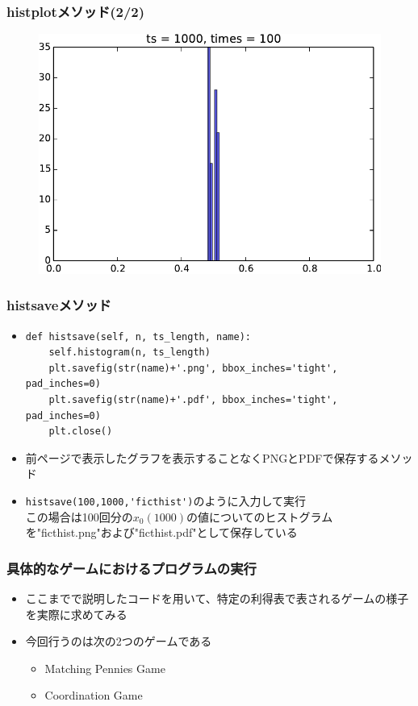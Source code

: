 \documentclass[dvipdfmx,fleqn,handout]{beamer}
\begin{document}
\begin{frame}
\frametitle{histplotメソッド(2/2)}
\begin{figure}
 \centering
 \includegraphics[width=\linewidth]{histogram2.pdf}
 \label{fig:matchingpennies_plot}
\end{figure}
\end{frame}

\begin{frame}[fragile]%
\frametitle{histsaveメソッド}
\begin{itemize}\setlength{\parskip}{0.5em}
\item
\scriptsize
\begin{verbatim}
def histsave(self, n, ts_length, name):
    self.histogram(n, ts_length)
    plt.savefig(str(name)+'.png', bbox_inches='tight', pad_inches=0)
    plt.savefig(str(name)+'.pdf', bbox_inches='tight', pad_inches=0)
    plt.close()
\end{verbatim}
\normalsize
\item
前ページで表示したグラフを表示することなくPNGとPDFで保存するメソッド\pause
\item
\verb|histsave(100,1000,'ficthist')|のように入力して実行\pause\\
この場合は100回分の$x_0(1000)$の値についてのヒストグラムを"ficthist.png"および"ficthist.pdf"として保存している
\end{itemize}
\end{frame}



\begin{frame}
\frametitle{具体的なゲームにおけるプログラムの実行}
\begin{itemize}\setlength{\parskip}{0.5em}
\item
ここまでで説明したコードを用いて、特定の利得表で表されるゲームの様子を実際に求めてみる
\item
今回行うのは次の2つのゲームである\pause
\begin{itemize}\setlength{\parskip}{0.5em}
\item
Matching Pennies Game
\item
Coordination Game
\end{itemize}
\end{itemize}
\end{frame}
\end{document}
